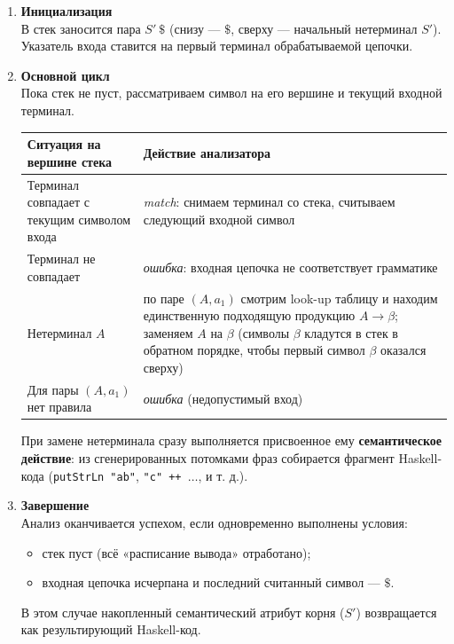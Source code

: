 \documentclass[areasetadvanced]{scrartcl}
\begin{document}
\begin{enumerate}
  \item \textbf{Инициализация}\\
  В стек заносится пара $S'\ \$$ (снизу — $\$$, сверху — начальный нетерминал $S'$). Указатель входа ставится на первый терминал обрабатываемой цепочки.

  \item \textbf{Основной цикл}\\
  Пока стек не пуст, рассматриваем символ на его вершине и текущий входной терминал.

  \begin{tabular}{|p{}|p{}|}
    \hline
    \textbf{Ситуация на вершине стека} & \textbf{Действие анализатора} \\
    \hline
    Терминал совпадает с текущим символом входа & \textit{match}: снимаем терминал со стека, считываем следующий входной символ \\
    Терминал не совпадает & \textit{ошибка}: входная цепочка не соответствует грамматике \\
    Нетерминал $A$ & по паре $(A, a_1)$ смотрим look-up таблицу и находим единственную подходящую продукцию $A \rightarrow \beta$; заменяем $A$ на $\beta$ (символы $\beta$ кладутся в стек в обратном порядке, чтобы первый символ $\beta$ оказался сверху) \\
    Для пары $(A, a_1)$ нет правила & \textit{ошибка} (недопустимый вход) \\
    \hline
  \end{tabular}

  При замене нетерминала сразу выполняется присвоенное ему \textbf{семантическое действие}: из сгенерированных потомками фраз собирается фрагмент Haskell-кода (\texttt{putStrLn "ab"}, \texttt{"c" ++ $\dots$}, и т. д.).

  \item \textbf{Завершение}\\
  Анализ оканчивается успехом, если одновременно выполнены условия:
  \begin{itemize}
    \item стек пуст (всё «расписание вывода» отработано);
    \item входная цепочка исчерпана и последний считанный символ — $\$$.
  \end{itemize}
  В этом случае накопленный семантический атрибут корня ($S'$) возвращается как результирующий Haskell-код.


\end{enumerate}
\end{document}
